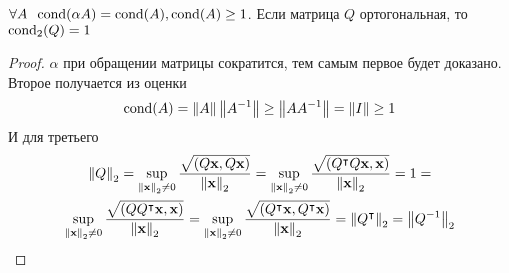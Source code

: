 \begin{lemma}
  $\forall A \;\; \operatorname{cond}(\alpha A) = \operatorname{cond}(A), \operatorname{cond}(A) \ge 1$. Если матрица $Q$ ортогональная, то $\operatorname{cond}_2(Q) = 1$
  \begin{proof}
    $\alpha$ при обращении матрицы сократится, тем самым первое будет доказано. Второе получается из оценки
    $$
      \operatorname{cond}(A) = \left\lVert A\right\rVert\left\lVert A^{-1}\right\rVert \ge \left\lVert A A^{-1}\right\rVert = \left\lVert I\right\rVert \ge 1
    $$
    И для третьего
    \begin{multline*}
      \left\lVert Q\right\rVert_2 = \sup_{\left\lVert\mathbf{x}\right\rVert_{2} \neq 0} \frac{\sqrt{(Q\mathbf{x}, Q\mathbf{x})}}{\left\lVert\mathbf{x}\right\rVert_{2}} =
      \sup_{\left\lVert\mathbf{x}\right\rVert_{2} \neq 0} \frac{\sqrt{(Q^\intercal Q\mathbf{x}, \mathbf{x})}}{\left\lVert\mathbf{x}\right\rVert_{2}} = 1 = \\
      \sup_{\left\lVert\mathbf{x}\right\rVert_{2} \neq 0} \frac{\sqrt{(Q Q^\intercal \mathbf{x}, \mathbf{x})}}{\left\lVert\mathbf{x}\right\rVert_{2}} =
      \sup_{\left\lVert\mathbf{x}\right\rVert_{2} \neq 0} \frac{\sqrt{( Q^\intercal \mathbf{x},Q^\intercal \mathbf{x})}}{\left\lVert\mathbf{x}\right\rVert_{2}} =
      \left\lVert Q^\intercal\right\rVert_2 =
      \left\lVert Q^{-1}\right\rVert_2
    \end{multline*}
  \end{proof}
\end{lemma}

